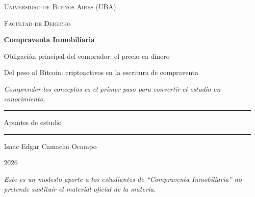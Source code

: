 \documentclass[12pt,oneside,a4paper]{book}
\newcommand{\universidad}{Universidad de Buenos Aires (UBA)}
\newcommand{\facultad}{Facultad de Derecho}
\newcommand{\materia}{Compraventa Inmobiliaria}
\newcommand{\titulo}{Obligación principal del comprador: el precio en dinero}
\newcommand{\subtitulo}{Del peso al Bitcoin: criptoactivos en la escritura de compraventa}
\newcommand{\autor}{Isaac Edgar Camacho Ocampo}
\newcommand{\anio}{2026}
\begin{document}
\begin{titlepage}
\thispagestyle{empty}
\begin{center}

\vspace*{1cm}

{\large \textsc{\universidad}}

\vspace{0.2cm}

{\large \textsc{\facultad}}

\vspace{2.5cm}

{\Huge \textbf{\materia}}

\vspace{1cm}

{\LARGE \titulo}

\vspace{0.4cm}

{\large \subtitulo}

\vspace{0.8cm}

\textit{\small Comprender los conceptos es el primer paso para convertir el estudio en conocimiento.}

\vspace{1.2cm}

\rule{0.70\textwidth}{0.5pt}

\vspace{0.5cm}

{\large Apuntes de estudio}

\vspace{0.5cm}

\rule{0.70\textwidth}{0.5pt}

\vfill

{\large \autor}

\vspace{0.3cm}

{\large \anio}

\end{center}

\vfill

\begin{flushleft}
\textit{Este es un modesto aporte a los estudiantes de ``\materia'' no pretende sustituir el material oficial de la materia.}
\end{flushleft}

\end{titlepage}

\tableofcontents
\end{document}
